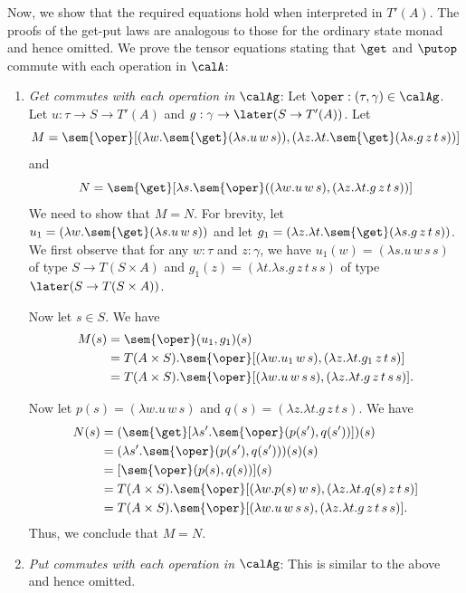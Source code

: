 Now, we show that the required equations hold when interpreted in $T'(A)$.
%
The proofs of the get-put laws are analogous to those for the ordinary state
monad and hence omitted.
%
We prove the tensor equations stating that $\get$ and $\putop$ commute with each
operation in $\calA$:
\begin{enumerate}
    \item \emph{Get commutes with each operation in $\calAg$}: Let $\oper :
    (\tau, \gamma) \in \calAg$. Let $u : \tau \to S \to T'(A)$ and $g : \gamma \to
    \later(S \to T'(A))$. Let
    \[ 
        M = \sem{\oper}[
              (\lambda w. \sem{\get}(\lambda s. u\, w\, s)),
              (\lambda z. \lambda t.\sem{\get}(\lambda s. g\, z\, t\, s))]
    \] 
    and
    \[
        N = \sem{\get}[\lambda s. 
              \sem{\oper}((\lambda w. u\, w\, s), (\lambda z. \lambda t. g\, z\, t\, s))]
    \]
    We need to show that $M = N$. For brevity, let
    $u_1 = (\lambda w. \sem{\get}(\lambda s. u\, w\, s))$ and let 
    $g_1 = (\lambda z. \lambda t.\sem{\get}(\lambda s. g\, z\, t\, s))$.
    We first observe that for any $w : \tau$ and $z : \gamma$, we have
    $u_1(w) = (\lambda s. u\, w\, s\, s)$ of type $S \to T(S \times A)$ and 
    $g_1(z) = (\lambda t. \lambda s. g\, z\, t\, s\, s)$ of type $\later (S \to T(S \times A))$.
    
    Now let $s \in S$. We have
    \begin{align*}
        M(s) &= \sem{\oper}(u_1, g_1)(s) \\
             &= T(A \times S).\sem{\oper}[(\lambda w. u_1\, w\, s), (\lambda z. \lambda t. g_1\, z\, t\, s)] \\
             &= T(A \times S).\sem{\oper}[(\lambda w. u\, w\, s\, s), (\lambda z. \lambda t. g\, z\, t\, s\, s) ]. \\
    \end{align*}
    
    Now let $p(s) = (\lambda w. u\, w\, s)$ and $q(s) = (\lambda z. \lambda t. g\, z\, t\, s)$.
    We have
    \begin{align*}
        N(s) &= (\sem{\get}[\lambda s'. \sem{\oper}(p(s'), q(s'))])(s) \\
             &= (\lambda s'. \sem{\oper}(p(s'), q(s')))(s)(s) \\
             &= [\sem{\oper}(p(s), q(s))](s) \\
             &= T(A \times S).\sem{\oper}[(\lambda w. p(s)\, w\, s), (\lambda z. \lambda t. q(s)\, z\, t\, s)] \\
             &= T(A \times S).\sem{\oper}[(\lambda w. u\, w\, s\, s), (\lambda z. \lambda t. g\, z\, t\, s\, s)].
    \end{align*}
    Thus, we conclude that $M = N$.
    
    \item \emph{Put commutes with each operation in $\calAg$}: This is similar to
    the above and hence omitted.
\end{enumerate}

